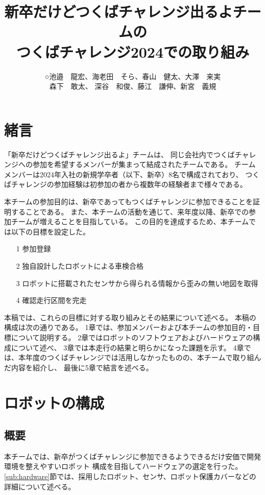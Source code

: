 \documentclass[twocolumn,9pt]{jsproceedings}
\title{新卒だけどつくばチャレンジ出るよチームの\\つくばチャレンジ2024での取り組み}
\author{○池邉　龍宏\authorrefmark{1}、海老田　そら\authorrefmark{1}、春山　健太\authorrefmark{1}、大澤　来実\authorrefmark{1}\\森下　敢太\authorrefmark{1}、
深谷　和俊\authorrefmark{1}、藤江　謙伸\authorrefmark{1}、新宮　義規\authorrefmark{1}}
\affiliation{新卒だけどつくばチャレンジ出るよ}
\begin{document}
\maketitle


\section{緒言}\label{sec:1}

「新卒だけどつくばチャレンジ出るよ」チームは、
同じ会社内でつくばチャレンジへの参加を希望するメンバーが集まって結成されたチームである。
チームメンバーは2024年入社の新規学卒者（以下、新卒）8名で構成されており、
つくばチャレンジの参加経験は初参加の者から複数年の経験者まで様々である。

本チームの参加目的は、新卒であってもつくばチャレンジに参加できることを証明することである。
また、本チームの活動を通じて、来年度以降、新卒での参加チームが増えることを目指している。
この目的を達成するため、本チームでは以下の目標を設定した。
\begin{itemize}
  \item[1] 参加登録
  \item[2] 独自設計したロボットによる車検合格
  \item[3] ロボットに搭載されたセンサから得られる情報から歪みの無い地図を取得
  \item[4] 確認走行区間を完走
\end{itemize}


本稿では、これらの目標に対する取り組みとその結果について述べる。
本稿の構成は次の通りである。
1章では、参加メンバーおよび本チームの参加目的・目標について説明する。
2章ではロボットのソフトウェアおよびハードウェアの構成について述べ、
3章では本走行の結果と明らかになった課題を示す。
4章では、本年度のつくばチャレンジでは活用しなかったものの、本チームで取り組んだ内容を紹介し、
最後に5章で結言を述べる。

\section{ロボットの構成}

\subsection{概要}
本チームでは、新卒がつくばチャレンジに参加できるようできるだけ安価で開発環境を整えやすいロボット
構成を目指してハードウェアの選定を行った。
\ref{sub:hardware}節では、採用したロボット、センサ、ロボット保護カバーなどの詳細について述べる。
\end{document}
